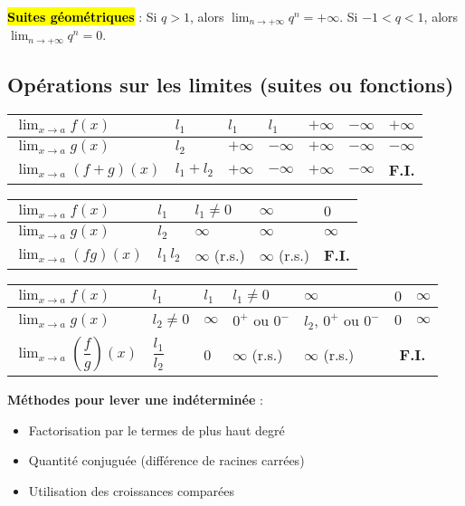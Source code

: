 \documentclass[10pt,fleqn, openany, landscape, twocolumn]{book} %
\begin{document}
\hl{\textbf{Suites géométriques}} : Si $q>1$, alors $\displaystyle\lim_{n\to +\infty}q^n=+\infty$. Si $-1<q<1$, alors $\displaystyle\lim_{n\to + \infty}q^n=0$.




\subsection*{Opérations sur les limites (suites ou fonctions)}


\begin{tabularx}{\linewidth}{|l|X|X|X|X|X|X|}
\hline
$\displaystyle \lim_{x \to a} f(x)$ & $l_1$ & $l_1$ & $l_1$ & $+\infty$ & $-\infty$ & $+\infty$\\
\hline
$\displaystyle \lim_{x \to a} g(x)$ & $l_2$ & $+\infty$ & $-\infty$ & $+\infty$ & $-\infty$ & $-\infty$\\
\hline
$\displaystyle \lim_{x \to a} (f+g)(x)$ & $l_1+l_2$ & $+\infty$ & $-\infty$ & $+\infty$ & $-\infty$ & \textbf{F.I.} \\
\hline
\end{tabularx}

\begin{tabularx}{\linewidth}{|l|X|X|X|X|}
\hline
$\displaystyle \lim_{x \to a} f(x)$ & $l_1 $ & $l_1 \neq 0$ &  $\infty$ & $0$ \\
\hline
$\displaystyle \lim_{x \to a} g(x)$ & $l_2$ & $\infty$  & $\infty$  & $\infty$ \\
\hline
$\displaystyle \lim_{x \to a} (fg)(x)$ & $l_1\,l_2$ & $\infty$ (r.s.)  & $\infty$ (r.s.) & \textbf{F.I.} \\
\hline
\end{tabularx}


\begin{tabularx}{\linewidth}{|l|X|X|X|X|c|c|}
\hline
$\displaystyle \lim_{x \to a} f(x)$ & $l_1 $ & $l_1$ & $l_1 \neq 0$ & $\infty$  & $0$ & $\infty$\\
\hline
$\displaystyle \lim_{x \to a} g(x)$ & $l_2 \neq 0$ & $\infty$ &  $0^+$ ou $0^-$ &  $l_2$, $0^+$ ou $0^-$ & $0$ & $\infty$ \\
\hline
$\displaystyle \lim_{x \to a} \left(\dfrac{f}{g}\right)(x)$ & $\dfrac{l_1}{l_2}$ & 0 & $\infty$  (r.s.)  & $\infty$ (r.s.) & \multicolumn{2}{|c|}{\textbf{F.I.}} \\
\hline\end{tabularx}

\textbf{Méthodes pour lever une indéterminée} :
\begin{itemize}
\item Factorisation par le termes de plus haut degré
\item Quantité conjuguée (différence de racines carrées)
\item Utilisation des croissances comparées
\end{itemize}
\end{document}
